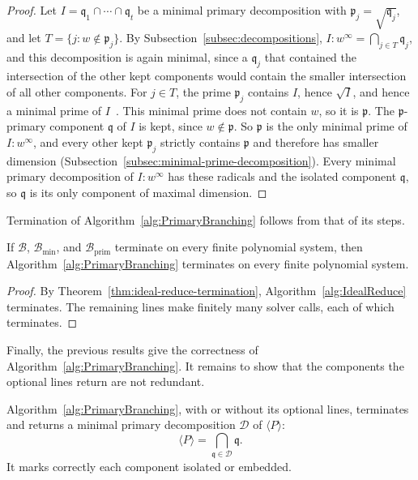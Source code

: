 \begin{proof}
  Let $I=\mathfrak q_1\cap\cdots\cap\mathfrak q_t$ be a minimal primary
  decomposition with $\mathfrak p_j=\sqrt{\mathfrak q_j}$, and let
  $T=\{j:w\notin\mathfrak p_j\}$. By Subsection~\ref{subsec:decompositions},
  $I:w^\infty=\bigcap_{j\in T}\mathfrak q_j$, and this decomposition is again
  minimal, since a $\mathfrak q_j$ that contained the intersection of the other
  kept components would contain the smaller intersection of all other
  components. For $j\in T$, the prime $\mathfrak p_j$ contains $I$, hence
  $\sqrt I$, and hence a minimal prime of
  $I$~\cite[Prop.~1.11]{atiyah1969introduction}. This minimal prime does not
  contain $w$, so it is $\mathfrak p$. The $\mathfrak p$-primary component
  $\mathfrak q$ of $I$ is kept, since $w\notin\mathfrak p$. So $\mathfrak p$ is
  the only minimal prime of $I:w^\infty$, and every other kept $\mathfrak p_j$
  strictly contains $\mathfrak p$ and therefore has smaller dimension
  (Subsection~\ref{subsec:minimal-prime-decomposition}). Every minimal primary
  decomposition of $I:w^\infty$ has these radicals and the isolated component
  $\mathfrak q$, so $\mathfrak q$ is its only component of maximal dimension.
\end{proof}

Termination of Algorithm~\ref{alg:PrimaryBranching} follows from that of its
steps.

\begin{theorem}
  \label{thm:primary-branching-termination}
  If $\mathcal B$, $\mathcal B_{\min}$, and $\mathcal B_{\mathrm{prim}}$
  terminate on every finite polynomial system, then
  Algorithm~\ref{alg:PrimaryBranching} terminates on every finite polynomial
  system.
\end{theorem}

\begin{proof}
  By Theorem~\ref{thm:ideal-reduce-termination}, Algorithm~\ref{alg:IdealReduce}
  terminates. The remaining lines make finitely many solver calls, each of
  which terminates.
\end{proof}

Finally, the previous results give the correctness of
Algorithm~\ref{alg:PrimaryBranching}. It remains to show that the components
the optional lines return are not redundant.

\begin{theorem}
  \label{thm:primary-branching}
  Algorithm~\ref{alg:PrimaryBranching}, with or without its optional lines,
  terminates and returns a minimal primary decomposition $\mathcal D$ of
  $\langle P\rangle$:
  \[
    \langle P\rangle=\bigcap_{\mathfrak q\in\mathcal D}\mathfrak q.
  \]
  It marks correctly each component isolated or embedded.
\end{theorem}

